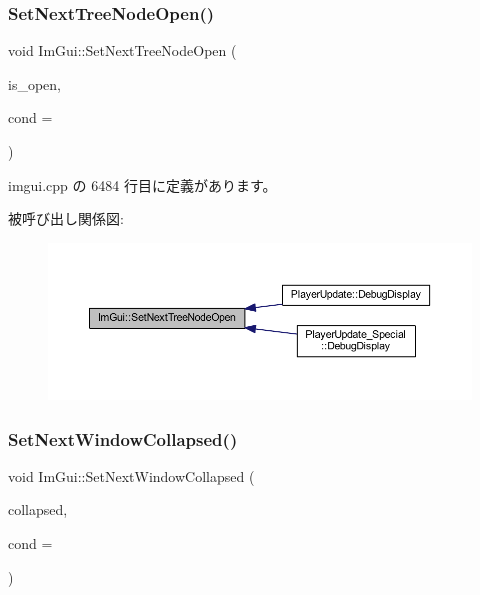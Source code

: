 \subsubsection{\texorpdfstring{Set\+Next\+Tree\+Node\+Open()}{SetNextTreeNodeOpen()}}
{\footnotesize\ttfamily void Im\+Gui\+::\+Set\+Next\+Tree\+Node\+Open (\begin{DoxyParamCaption}\item[{bool}]{is\+\_\+open,  }\item[{\mbox{\hyperlink{imgui_8h_aef890d6ac872e12c5804d0b3e4f7f103}{Im\+Gui\+Cond}}}]{cond = {} }\end{DoxyParamCaption})}



 imgui.\+cpp の 6484 行目に定義があります。

被呼び出し関係図\+:\nopagebreak
\begin{figure}[H]
\begin{center}
\leavevmode
\includegraphics[width=350pt]{namespace_im_gui_ab9a0c20b04a753449494fb20ec2e0e87_icgraph}
\end{center}
\end{figure}
\mbox{\label{namespace_im_gui_a3e9380e253a3c49665a404e56950a52a}} 
\subsubsection{\texorpdfstring{Set\+Next\+Window\+Collapsed()}{SetNextWindowCollapsed()}}
{\footnotesize\ttfamily void Im\+Gui\+::\+Set\+Next\+Window\+Collapsed (\begin{DoxyParamCaption}\item[{bool}]{collapsed,  }\item[{\mbox{\hyperlink{imgui_8h_aef890d6ac872e12c5804d0b3e4f7f103}{Im\+Gui\+Cond}}}]{cond = {} }\end{DoxyParamCaption})}



